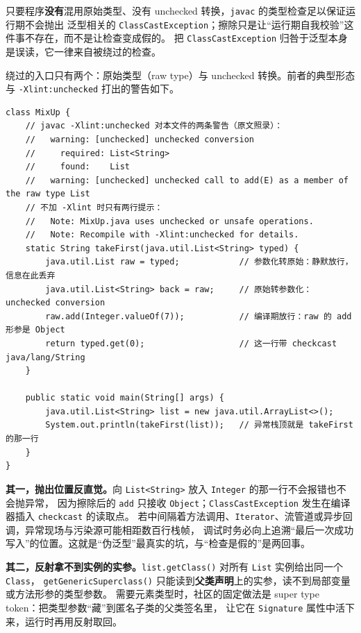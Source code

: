 \documentclass[12pt,a4paper,fontset=fandol]{ctexbook}
\newcommand{\javalabel}{%
  \tcbox[on line,colback=javaheadbg,colframe=javaheadbg,
    boxrule=0pt,arc=1pt,left=2pt,right=2pt,top=1pt,bottom=1pt,
    colupper=white,fontupper=\scriptsize\bfseries]{Java}}
\newcommand{\kw}[1]{\texttt{#1}}
\begin{document}
\begin{guideline}[title={擦除丢的是运行期具化，不是静态检查}]
只要程序\textbf{没有}混用原始类型、没有 unchecked 转换，\kw{javac} 的类型检查足以保证运行期不会抛出
泛型相关的 \kw{ClassCastException}；擦除只是让“运行期自我校验”这件事不存在，而不是让检查变成假的。
把 \kw{ClassCastException} 归咎于泛型本身是误读，它一律来自被绕过的检查。
\end{guideline}

绕过的入口只有两个：原始类型（raw type）与 unchecked 转换。前者的典型形态与 \kw{-Xlint:unchecked} 打出的警告如下。

\javalabel
\begin{lstlisting}[style=javastyle,caption={heap pollution：写入端放行，ClassCastException 在读取端的 checkcast 抛出}]
class MixUp {
    // javac -Xlint:unchecked 对本文件的两条警告（原文照录）：
    //   warning: [unchecked] unchecked conversion
    //     required: List<String>
    //     found:    List
    //   warning: [unchecked] unchecked call to add(E) as a member of the raw type List
    // 不加 -Xlint 时只有两行提示：
    //   Note: MixUp.java uses unchecked or unsafe operations.
    //   Note: Recompile with -Xlint:unchecked for details.
    static String takeFirst(java.util.List<String> typed) {
        java.util.List raw = typed;            // 参数化转原始：静默放行，信息在此丢弃
        java.util.List<String> back = raw;     // 原始转参数化：unchecked conversion
        raw.add(Integer.valueOf(7));           // 编译期放行：raw 的 add 形参是 Object
        return typed.get(0);                   // 这一行带 checkcast java/lang/String
    }

    public static void main(String[] args) {
        java.util.List<String> list = new java.util.ArrayList<>();
        System.out.println(takeFirst(list));   // 异常栈顶就是 takeFirst 的那一行
    }
}
\end{lstlisting}

\begin{warning}[title={异常在“取出时”抛出，而不是“放入时”；擦除也不是免费的}]
\textbf{其一，抛出位置反直觉。}向 \kw{List<String>} 放入 \kw{Integer} 的那一行不会报错也不会抛异常，
因为擦除后的 \kw{add} 只接收 \kw{Object}；\kw{ClassCastException} 发生在编译器插入 \kw{checkcast} 的读取点。
若中间隔着方法调用、\kw{Iterator}、流管道或异步回调，异常现场与污染源可能相距数百行栈帧，
调试时务必向上追溯“最后一次成功写入”的位置。这就是“伪泛型”最真实的坑，与“检查是假的”是两回事。

\textbf{其二，反射拿不到实例的实参。}\kw{list.getClass()} 对所有 \kw{List} 实例给出同一个 \kw{Class}，
\kw{getGenericSuperclass()} 只能读到\textbf{父类声明}上的实参，读不到局部变量或方法形参的类型参数。
需要元素类型时，社区的固定做法是 super type token：把类型参数“藏”到匿名子类的父类签名里，
让它在 \kw{Signature} 属性中活下来，运行时再用反射取回。
\end{warning}
\end{document}
